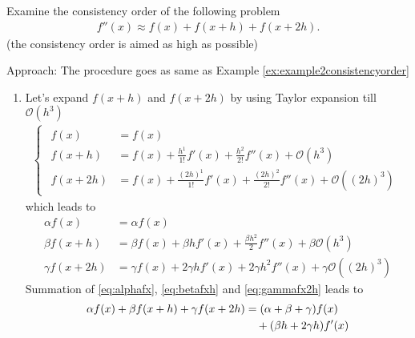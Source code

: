 \documentclass[12pt]{article}
\begin{document}
\newpage
\begin{example}
	Examine the consistency order of the following problem
	\begin{align*}
		f''(x) \approx f(x) + f(x+h) + f(x+2h).
	\end{align*}
	(the consistency order is aimed as high as possible)
\end{example}
Approach: The procedure goes as same as Example \ref{ex:example2consistencyorder}
\begin{enumerate}
	\item Let's expand $f(x+h)$ and $f(x+2h)$
	      by using Taylor expansion till $\mathcal{O}(h^3)$
	      \begin{align}
		      \label{eq:firstfhreeTaylor}
		      \begin{cases}
			      \begin{aligned}
				      f(x)    & = f(x)                \\
				      f(x+ h) & = f(x) 
				      + \frac{h^1}{1!} f'(x)  
				      + \frac{h^2}{2!} f''(x)  
				      + \mathcal{O}\left( h^3 \right) \\
				      f(x+2h) & = f(x) 
				      + \frac{(2h)^1}{1!} f'(x) 
				      + \frac{(2h)^2}{2!} f''(x) 
				      + \mathcal{O}\left( (2h)^3 \right)
			      \end{aligned}
		      \end{cases}
	      \end{align}
	      which leads to 
	      \begin{align}
		      \alpha f(x)    & = \alpha f(x)  \label{eq:alphafx}                    \\
		      \beta f(x+ h)  & = \beta f(x) 
		      + \beta h f'(x)  
		      + \frac{\beta h^2}{2} f''(x)
		      + \beta \mathcal{O}\left( h^3 \right)              \label{eq:betafxh} \\
		      \gamma f(x+2h) & = \gamma f(x) 
		      + 2\gamma h f'(x)  
		      + 2\gamma h^2 f''(x)
		      + \gamma \mathcal{O}\left( (2h)^3 \right) \label{eq:gammafx2h}
	      \end{align}
	      Summation of \eqref{eq:alphafx}, \eqref{eq:betafxh} and \eqref{eq:gammafx2h} leads to
	      \begin{align}
		      \label{eq:summationall}
		      \alpha f(x) + \beta f(x+h) + \gamma f(x+2h) 
		       & = (\alpha + \beta + \gamma)f(x) \notag                                \\
		       & \quad + (\beta h + 2 \gamma h)f'(x) \notag                            \\

\end{align}
\end{enumerate}
\end{document}

